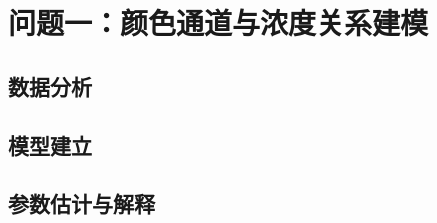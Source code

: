 \section{问题一：颜色通道与浓度关系建模}\label{sec:model_q1}
\subsection{数据分析}\label{sec:q1_eda}

\subsection{模型建立}\label{sec:q1_model_build}

\subsection{参数估计与解释}\label{sec:q1_param}
